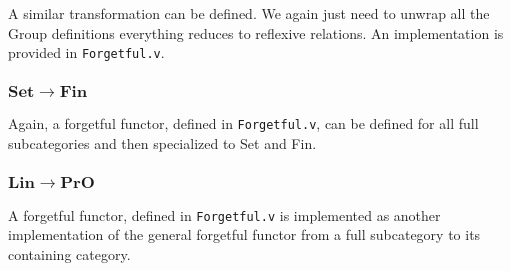 \documentclass[12pt,twocolumn,oneside]{book}
\begin{document}
A similar transformation can be defined. We again just need to unwrap all the Group
definitions everything reduces to reflexive relations. An implementation is provided
in \texttt{Forgetful.v}.


\subsubsection{$\mathbf{Set} \to \mathbf{Fin}$}

Again, a forgetful functor, defined in \texttt{Forgetful.v}, can be defined for all full
subcategories and then specialized to Set and Fin.

\subsubsection{$\mathbf{Lin} \to \mathbf{PrO}$}

A forgetful functor, defined in \texttt{Forgetful.v} is implemented as another
implementation of the general forgetful functor from a full subcategory to its
containing category.
\end{document}
